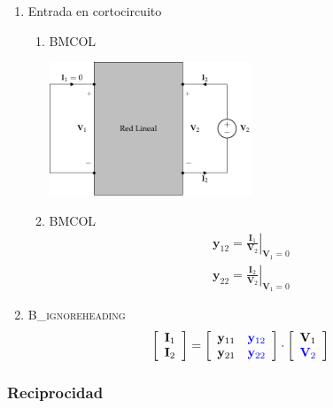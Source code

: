 \begin{enumerate}
\item Entrada en cortocircuito
\label{sec:org1d8c65d}

\begin{enumerate}
\item \hfill{}\textsc{BMCOL}
\label{sec:orgda9e197}
\begin{center}
\includegraphics[height=4cm]{../figs/parametrosY_salida.pdf}
\end{center}

\item \hfill{}\textsc{BMCOL}
\label{sec:org35720cd}
\renewcommand{\arraystretch}{2}
\[
  \begin{array}{c}
    \mathbf{y}_{12} = \left.\frac{\mathbf{I}_1}{\mathbf{V}_2}\right\rvert_{\mathbf{V}_1 = 0}\\
    \mathbf{y}_{22} = \left.\frac{\mathbf{I}_2}{\mathbf{V}_2}\right\rvert_{\mathbf{V}_1 = 0}
  \end{array}
\]
\end{enumerate}

\item \hfill{}\textsc{B\_ignoreheading}
\label{sec:org5814116}
\[
  \left[
    \begin{array}{c}
      \mathbf{I}_1\\
      \mathbf{I}_2
    \end{array}
  \right] =
  \left[
    \begin{array}{cc}
      \mathbf{y}_{11} & \color{blue}{\mathbf{y}_{12}}\\
      \mathbf{y}_{21} & \color{blue}{\mathbf{y}_{22}}
    \end{array}
  \right] \cdot
  \left[
    \begin{array}{c}
      \mathbf{V}_1\\
      \color{blue}{\mathbf{V}_2}
    \end{array}
  \right]
\]
\end{enumerate}

\subsubsection{Reciprocidad}
\label{sec:orge3f94a7}

